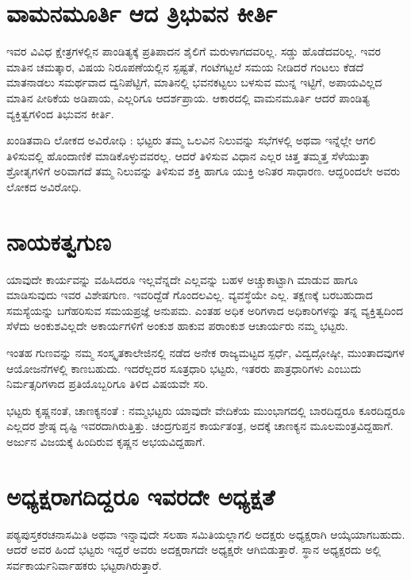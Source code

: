 {\section*{ವಾಮನಮೂರ್ತಿ ಆದ ತ್ರಿಭುವನ ಕೀರ್ತಿ}  

ಇವರ ವಿವಿಧ ಕ್ಷೇತ್ರಗಳಲ್ಲಿನ  ಪಾಂಡಿತ್ಯಕ್ಕೆ ಪ್ರತಿಪಾದನ ಶೈಲಿಗೆ ಮರುಳಾಗದವರಿಲ್ಲ.  ಸಡ್ಡು ಹೊಡೆದವರಿಲ್ಲ.  ಇವರ ಮಾತಿನ ಚಮತ್ಕಾರ, ವಿಷಯ ನಿರೂಪಣೆಯಲ್ಲಿನ ಸ್ಪಷ್ಟತೆ, ಗಂಟೆಗಟ್ಟಲೆ ಸಮಯ ನೀಡಿದರೆ ಗಂಟಲು ಕೆಡದೆ ಮಾತನಾಡಲು ಸಮರ್ಥವಾದ ದ್ವನಿಪೆಟ್ಟಿಗೆ, ಮಾತಿನಲ್ಲಿ ಭವನಕಟ್ಟಲು ಬಳಸುವ ಮುನ್ನ ಇಟ್ಟಿಗೆ, ಅಪಾಯವಿಲ್ಲದ ಮಾತಿನ ಪೀಠಿಕೆಯ ಅಡಿಪಾಯ, ಎಲ್ಲರಿಗೂ ಆದರ್ಶಪ್ರಾಯ.  ಆಕಾರದಲ್ಲಿ ವಾಮನಮೂರ್ತಿ ಆದರೆ ಪಾಂಡಿತ್ಯ ವ್ಯಕ್ತಿತ್ವಗಳಿಂದ ತಿಭುವನ ಕೀರ್ತಿ.

ಖಂಡಿತವಾದಿ ಲೋಕದ ಅವಿರೋಧಿ :  \enginline{-}    ಭಟ್ಟರು ತಮ್ಮ ಒಲವಿನ ನಿಲುವನ್ನು ಸಭೆಗಳಲ್ಲಿ ಅಥವಾ ಇನ್ನೆಲ್ಲೇ ಆಗಲಿ ತಿಳಿಸುವಲ್ಲಿ ಹೊಂದಾಣಿಕೆ ಮಾಡಿಕೊಳ್ಳುವವರಲ್ಲ.  ಆದರೆ ತಿಳಿಸುವ ವಿಧಾನ ಎಲ್ಲರ ಚಿತ್ತ ತಮ್ಮತ್ತ ಸೆಳೆಯುತ್ತಾ ಶ್ರೋತೃಗಳಿಗೆ ಅರಿವಾಗದೆ ತಮ್ಮ ನಿಲುವನ್ನು ತಿಳಿಸುವ ಶಕ್ತಿ ಹಾಗೂ ಯುಕ್ತಿ ಅನಿತರ ಸಾಧಾರಣ.  ಆದ್ದರಿಂದಲೇ ಅವರು ಲೋಕದ ಅವಿರೋಧಿ.
\vskip -20pt

\section*{ನಾಯಕತ್ವಗುಣ} 
\vskip -5pt

ಯಾವುದೇ ಕಾರ್ಯವನ್ನು ವಹಿಸಿದರೂ ಇಲ್ಲವೆನ್ನದೇ ಎಲ್ಲವನ್ನು ಬಹಳ ಅಚ್ಚುಕಾಟ್ಟಾಗಿ ಮಾಡುವ ಹಾಗೂ ಮಾಡಿಸುವುದು ಇವರ ವಿಶೇಷಗುಣ.  ಇವರಿದ್ದೆಡೆ ಗೊಂದಲವಿಲ್ಲ.  ವ್ಯವಸ್ಥೆಯೇ ಎಲ್ಲ.  ತಕ್ಷಣಕ್ಕೆ ಬರಬಹುದಾದ ಸಮಸ್ಯೆಯನ್ನು ಬಗೆಹರಿಸುವ ಸಮಯಪ್ರಜ್ಞೆ ಅನುಪಮ.  ಎಂತಹ ಅಧಿಕ ಅರಿಗಳಾದ ಅಧಿಕಾರಿಗಳನ್ನು ತನ್ನ ವ್ಯಕ್ತಿತ್ವದಿಂದ ಸೆಳೆದು ಅಂಕುಶವಿಲ್ಲದೇ ಅಕಾರ್ಯಗಳಿಗೆ ಅಂಕುಶ ಹಾಕುವ ಪರಾಂಕುಶ ಆಚಾರ್ಯರು ನಮ್ಮ ಭಟ್ಟರು.

ಇಂತಹ ಗುಣವನ್ನು ನಮ್ಮ ಸಂಸ್ಕೃತಕಾಲೇಜಿನಲ್ಲಿ ನಡೆದ ಅನೇಕ ರಾಜ್ಯಮಟ್ಟದ ಸ್ಪರ್ಧೆ, ವಿದ್ವದ್ಗೋಷ್ಠೀ, ಮುಂತಾದವುಗಳ ಆಯೋಜನೆಗಳಲ್ಲಿ ಕಾಣಬಹುದು.  ಇದರೆಲ್ಲ\-ದರ ಸೂತ್ರಧಾರಿ ಭಟ್ಟರು, ಇತರರು  ಪಾತ್ರಧಾರಿಗಳು ಎಂಬುದು ನಿರ್ಮತ್ಸರಿಗಳಾದ ಪ್ರತಿಯೊಬ್ಬರಿಗೂ ತಿಳಿದ ವಿಷಯವೇ ಸರಿ.

ಭಟ್ಟರು ಕೃಷ್ಣನಂತೆ, ಚಾಣಕ್ಯನಂತೆ :  \enginline{-}    ನಮ್ಮಭಟ್ಟರು ಯಾವುದೇ ವೇದಿಕೆಯ ಮುಂಭಾಗದಲ್ಲಿ ಬಾರದಿದ್ದರೂ ಕೂರದಿದ್ದರೂ ಎಲ್ಲದರ ಶ್ರೇಷ್ಠ ದೃಷ್ಟಿ   ಇವರದಾಗಿರುತ್ತಿತ್ತು. ಚಂದ್ರಗುಪ್ತನ ಕಾರ್ಯತಂತ್ರ, ಅದಕ್ಕೆ ಚಾಣಕ್ಯನ ಮೂಲಮಂತ್ರವಿದ್ದಹಾಗೆ.  ಅರ್ಜುನ ವಿಜಯಕ್ಕೆ ಹಿಂದಿರುವ ಕೃಷ್ಣನ ಅಭಯವಿದ್ದಹಾಗೆ. 

\section*{ಅಧ್ಯಕ್ಷರಾಗದಿದ್ದರೂ ಇವರದೇ ಅಧ್ಯಕ್ಷತೆ} 

ಪಠ್ಯಪುಸ್ತಕರಚನಾಸಮಿತಿ ಅಥವಾ ಇನ್ನಾವುದೇ ಸಲಹಾ ಸಮಿತಿಯಲ್ಲಾಗಲಿ ಅದಕ್ಷರು ಅಧ್ಯಕ್ಷರಾಗಿ ಆಯ್ಕೆಯಾಗಬಹುದು.  ಆದರೆ ಅವರ ಹಿಂದೆ ಭಟ್ಟರು ಇದ್ದರೆ ಅವರು ಅದಕ್ಷ\-ರಾಗದೇ ಅಧ್ಯಕ್ಷರೇ ಆಗಿಬಿಡುತ್ತಾರೆ.  ಸ್ಥಾನ ಅಧ್ಯಕ್ಷರದು ಅಲ್ಲಿ ಸರ್ವಕಾರ್ಯ\-ನಿರ್ವಾಹಕರು ಭಟ್ಟರಾಗಿರುತ್ತಾರೆ.
\vskip -10pt

}
